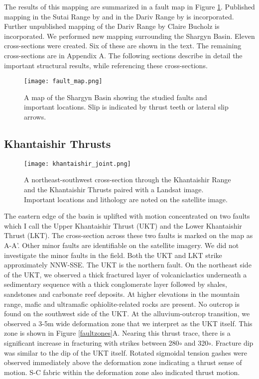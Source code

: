 The results of this mapping are summarized in a fault map in Figure \ref{faultmap}. Published mapping in the Sutai Range by \citet{Cunningham2003} and in the Dariv Range by \citet{Dijkstra2006} is incorporated. Further unpublished mapping of the Dariv Range by Claire Bucholz is incorporated. We performed new mapping surrounding the Shargyn Basin. Eleven cross-sections were created. Six of these are shown in the text. The remaining cross-sections are in Appendix A. The following sections describe in detail the important structural results, while referencing these cross-sections.
 
\begin{figure}[h!]
  \centering
  \texttt{[image: fault\_map.png]}
  \caption{A map of the Shargyn Basin showing the studied faults and important locations. Slip is indicated by thrust teeth or lateral slip arrows.}
  \label{faultmap}
\end{figure}


\subsection{Khantaishir Thrusts}

\begin{figure}[h!]
  \centering
  \texttt{[image: khantaishir\_joint.png]}
  \caption{A northeast-southwest cross-section through the Khantaishir Range and the Khantaishir Thrusts paired with a Landsat image. Important locations and lithology are noted on the satellite image.}
\end{figure}

The eastern edge of the basin is uplifted with motion concentrated on two faults which I call the Upper Khantaishir Thrust (UKT) and the Lower Khantaishir Thrust (LKT). The cross-section across these two faults is marked on the map as A-A'. Other minor faults are identifiable on the satellite imagery. We did not investigate the minor faults in the field. Both the UKT and LKT strike approximately NNW-SSE. The UKT is the northern fault. On the northeast side of the UKT, we observed a thick fractured layer of volcaniclastics underneath a sedimentary sequence with a thick conglomerate layer followed by shales, sandstones and carbonate reef deposits. At higher elevations in the mountain range, mafic and ultramafic ophiolite-related rocks are present. No outcrop is found on the southwest side of the UKT. At the alluvium-outcrop transition, we observed a 3-5m wide deformation zone that we interpret as the UKT itself. This zone is shown in Figure \ref{faultzones}A. Nearing this thrust trace, there is a significant increase in fracturing with strikes between 280$\circ$ and 320$\circ$. Fracture dip was similar to the dip of the UKT itself. Rotated sigmoidal tension gashes were observed immediately above the deformation zone indicating a thrust sense of motion. S-C fabric within the deformation zone also indicated thrust motion.

